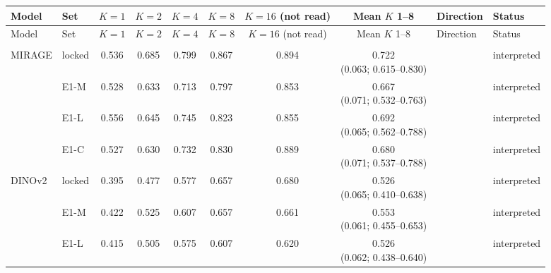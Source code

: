 \begin{longtable}{@{}p{3.0cm}lcccccclp{2.2cm}@{}}
\toprule
Model & Set & $K=1$ & $K=2$ & $K=4$ & $K=8$ & \makecell{$K=16$\\(not read)} & Mean $K$ 1--8 & Direction & Status \\
\midrule
\endfirsthead
\toprule
Model & Set & $K=1$ & $K=2$ & $K=4$ & $K=8$ & \makecell{$K=16$\\(not read)} & Mean $K$ 1--8 & Direction & Status \\
\midrule
\endhead
\bottomrule
\endfoot
\bottomrule
\endlastfoot
\multicolumn{10}{@{}l}{\emph{Five-way macro recall}} \\
MIRAGE & locked & 0.536 & 0.685 & 0.799 & 0.867 & 0.894 & \makecell{0.722\\{\scriptsize (0.063; 0.615--0.830)}} &  & interpreted \\
 & E1-M & 0.528 & 0.633 & 0.713 & 0.797 & 0.853 & \makecell{0.667\\{\scriptsize (0.071; 0.532--0.763)}} &  & interpreted \\
 & E1-L & 0.556 & 0.645 & 0.745 & 0.823 & 0.855 & \makecell{0.692\\{\scriptsize (0.065; 0.562--0.788)}} &  & interpreted \\
 & E1-C & 0.527 & 0.630 & 0.732 & 0.830 & 0.889 & \makecell{0.680\\{\scriptsize (0.071; 0.537--0.788)}} &  & interpreted \\
DINOv2 & locked & 0.395 & 0.477 & 0.577 & 0.657 & 0.680 & \makecell{0.526\\{\scriptsize (0.065; 0.410--0.638)}} &  & interpreted \\
 & E1-M & 0.422 & 0.525 & 0.607 & 0.657 & 0.661 & \makecell{0.553\\{\scriptsize (0.061; 0.455--0.653)}} &  & interpreted \\
 & E1-L & 0.415 & 0.505 & 0.575 & 0.607 & 0.620 & \makecell{0.526\\{\scriptsize (0.062; 0.438--0.640)}} &  & interpreted \\

\end{longtable}
